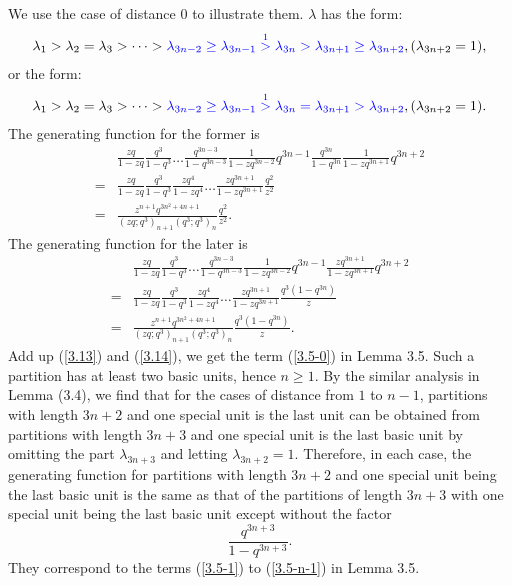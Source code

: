 \documentclass[draft]{amsart}
\numberwithin{equation}{section}
\theoremstyle{plain}
\theoremstyle{remark}
\begin{document}
We use the case of distance $0$ to illustrate them. $\lambda$ has the form:
\begin{align*}
\lambda_{1}>\lambda_{2}=\lambda_{3}>\dots
>{\color{blue}\lambda_{3n-2}\geq\lambda_{3n-1}\overset{1}{>}\lambda_{3n}>\lambda_{3n+1}\geq \lambda_{3n+2}}, (\lambda_{3n+2}=1),
\end{align*} 
or the form:
\begin{align*}
\lambda_{1}>\lambda_{2}=\lambda_{3}>\dots
>{\color{blue}\lambda_{3n-2}\geq\lambda_{3n-1}\overset{1}{>}\lambda_{3n}=\lambda_{3n+1}> \lambda_{3n+2}}, (\lambda_{3n+2}=1).
\end{align*} 
The generating function for the former is 
\begin{align}
& \frac{zq}{1-zq}\frac{q^{3}}{1-q^{3}}\dots\frac{q^{3n-3}}{1-q^{3n-3}}
 \frac{1}{1-zq^{3n-2}} q^{3n-1}\frac{q^{3n}}{1-q^{3n}}\frac{1}{1-zq^{3n+1}} q^{3n+2}\nonumber\\
=& \frac{zq}{1-zq}\frac{q^{3}}{1-q^{3}} \frac{zq^{4}}{1-zq^{4}}\dots\frac{zq^{3n+1}}{1-zq^{3n+1}} \frac{q^{2}}{z^{2}}\nonumber\\
=&\frac{z^{n+1}q^{3n^{2}+4n+1}}{(zq;q^{3})_{n+1}(q^{3};q^{3})_{n}}\frac{q^{2}}{z^{2}}.\label{3.13}
\end{align}
The generating function for the later is
\begin{align}
& \frac{zq}{1-zq}\frac{q^{3}}{1-q^{3}}\dots\frac{q^{3n-3}}{1-q^{3n-3}}
 \frac{1}{1-zq^{3n-2}} q^{3n-1}\frac{zq^{3n+1}}{1-zq^{3n+1}}q^{3n+2}\nonumber\\
=& \frac{zq}{1-zq}\frac{q^{3}}{1-q^{3}} \frac{zq^{4}}{1-zq^{4}}\dots\frac{zq^{3n+1}}{1-zq^{3n+1}} \frac{q^{3}(1-q^{3n})}{z}\nonumber\\
=&\frac{z^{n+1}q^{3n^{2}+4n+1}}{(zq;q^{3})_{n+1}(q^{3};q^{3})_{n}}\frac{q^{3}(1-q^{3n})}{z}.\label{3.14}
 \end{align} 
Add up (\ref{3.13}) and (\ref{3.14}), we get the term (\ref{3.5-0}) in Lemma 3.5. Such a partition has at least two basic units, hence $n\geq 1.$  By the similar analysis in Lemma (3.4), we  find  that for the cases of distance from $1$ to $n-1$, partitions with length $3n+2$ and one special unit is the last unit can be obtained from  partitions with length $3n+3$  and one special unit is the last basic unit by omitting the part $\lambda_{3n+3}$ and letting $\lambda_{3n+2}=1$. Therefore, in each case, the generating function for partitions  with length $3n+2$ and one special unit being the last basic unit is the same as that of the partitions of length $3n+3$ with one special unit being the last basic unit except without the factor 
$$\frac{q^{3n+3}}{1-q^{3n+3}}.$$
They correspond to the terms 
(\ref{3.5-1}) to (\ref{3.5-n-1}) in Lemma 3.5.
\end{document}
